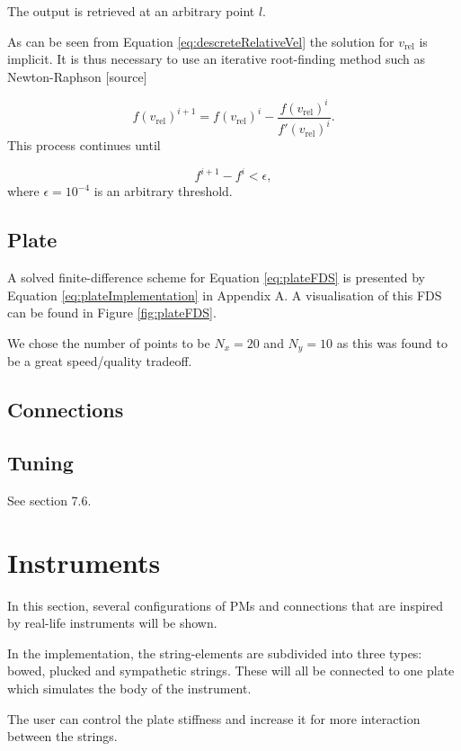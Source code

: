 \documentclass{article}
\begin{document}
The output is retrieved at an arbitrary point $l$.

As can be seen from Equation \eqref{eq:descreteRelativeVel} the solution for $v_\text{rel}$ is implicit. It is thus necessary to use an iterative root-finding method such as Newton-Raphson [source]

\begin{equation}\label{eq:newtonRaphson}
    f(v_\text{rel})^{i+1} = f(v_\text{rel})^i - \frac{f(v_\text{rel})^i}{f'(v_\text{rel})^i}.
\end{equation}
This process continues until 

\begin{equation} \nonumber
    f^{i+1}-f^i < \epsilon,
\end{equation}
where $\epsilon = 10^{-4}$ is an arbitrary threshold. 
\subsection{Plate}
A solved finite-difference scheme for Equation \eqref{eq:plateFDS} is presented by Equation \eqref{eq:plateImplementation} in Appendix A. A visualisation of this FDS can be found in Figure \ref{fig:plateFDS}. 

We chose the number of points to be $N_x = 20$ and $N_y = 10$ as this was found to be a great speed/quality tradeoff. 
\subsection{Connections}

\subsection{Tuning}
See \cite{Bilbao2009:NumericalSoundSynthesis} section 7.6.

\section{Instruments}\label{sec:instruments}

In this section, several configurations of PMs and connections that are inspired by real-life instruments will be shown.

In the implementation, the string-elements are subdivided into three types: bowed, plucked and sympathetic strings. These will all be connected to one plate which simulates the body of the instrument.

The user can control the plate stiffness and increase it for more interaction between the strings.
\end{document}
